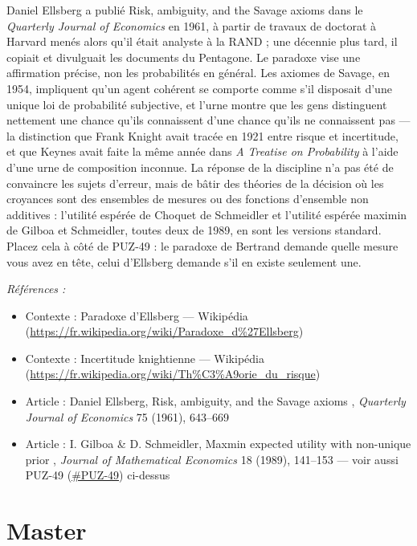 \documentclass[11pt]{article}
\newenvironment{refs}{\par\small\noindent\emph{Références :}\begin{itemize}\setlength\itemsep{0pt}}{\end{itemize}\normalsize}
\begin{document}
\noindent Daniel Ellsberg a publié \og{} Risk, ambiguity, and the Savage axioms \fg{} dans
le \textit{Quarterly Journal of Economics} en 1961, à partir de travaux de doctorat à Harvard
menés alors qu'il était analyste à la RAND ; une décennie plus tard, il copiait et divulguait
les documents du Pentagone. Le paradoxe vise une affirmation précise, non les probabilités en
général. Les axiomes de Savage, en 1954, impliquent qu'un agent cohérent se comporte comme
s'il disposait d'une unique loi de probabilité subjective, et l'urne montre que les gens
distinguent nettement une chance qu'ils connaissent d'une chance qu'ils ne connaissent pas ---
la distinction que Frank Knight avait tracée en 1921 entre risque et incertitude, et que
Keynes avait faite la même année dans \textit{A Treatise on Probability} à l'aide d'une urne de
composition inconnue. La réponse de la discipline n'a pas été de convaincre les sujets
d'erreur, mais de bâtir des théories de la décision où les croyances sont des ensembles de
mesures ou des fonctions d'ensemble non additives : l'utilité espérée de Choquet de
Schmeidler et l'utilité espérée maximin de Gilboa et Schmeidler, toutes deux de 1989, en sont
les versions standard. Placez cela à côté de PUZ-49 : le paradoxe de Bertrand demande quelle
mesure vous avez en tête, celui d'Ellsberg demande s'il en existe seulement une.

\begin{refs}
\item Contexte : Paradoxe d'Ellsberg --- Wikipédia (\url{https://fr.wikipedia.org/wiki/Paradoxe_d%27Ellsberg})
\item Contexte : Incertitude knightienne --- Wikipédia (\url{https://fr.wikipedia.org/wiki/Th%C3%A9orie_du_risque})
\item Article : Daniel Ellsberg, \og{} Risk, ambiguity, and the Savage axioms \fg{}, \textit{Quarterly Journal of Economics} 75 (1961), 643--669
\item Article : I. Gilboa \& D. Schmeidler, \og{} Maxmin expected utility with non-unique prior \fg{}, \textit{Journal of Mathematical Economics} 18 (1989), 141--153 --- voir aussi PUZ-49 (\url{#PUZ-49}) ci-dessus
\end{refs}

\bigskip


\section*{Master}
\end{document}
